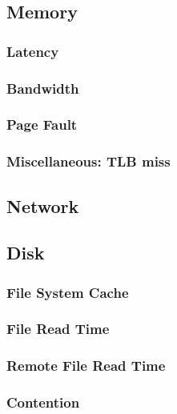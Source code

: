 \documentclass[paper=letter]{article}
\begin{document}
\newpage

\subsection{Memory}

\subsubsection{Latency}

\newpage

\subsubsection{Bandwidth}

\newpage

\subsubsection{Page Fault}

\newpage

\subsubsection{Miscellaneous: TLB miss}
\newpage
\subsection{Network}

\newpage
\subsection{Disk}


\subsubsection{File System Cache}\newpage

\subsubsection{File Read Time}\newpage

\subsubsection{Remote File Read Time}\newpage

\subsubsection{Contention}\newpage

\newpage

\printbibliography
\end{document}

